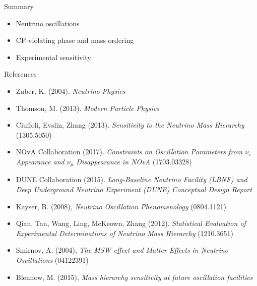 \documentclass{beamer}
\begin{document}
\begin{frame}{Summary}

	\begin{itemize}
		\item Neutrino oscillations
		\item CP-violating phase and mass ordering
		\item Experimental sensitivity
	\end{itemize}


\end{frame}

\begin{frame}{References}

	\scriptsize{
	\begin{itemize}
		\item Zuber, K. (2004). \emph{Neutrino Physics}
		\item Thomson, M. (2013). \emph{Modern Particle Physics}
		\item Ciuffoli, Evslin, Zhang (2013). \emph{Sensitivity to the Neutrino
			Mass Hierarchy}
			(1305.5050)
		\item NOvA Collaboration (2017). \emph{Constraints on Oscillation Parameters from
			$\nu_e$ Appearance and $\nu_\mu$ Disappearance in NOvA} (1703.03328)
		\item DUNE Collaboration (2015). \emph{Long-Baseline Neutrino Facility (LBNF) and
			Deep Underground Neutrino Experiment (DUNE) Conceptual Design Report}
		\item Kayser, B. (2008), \emph{Neutrino Oscillation Phenomenology} (0804.1121)
		\item Qian, Tan, Wang, Ling, McKeown, Zhang (2012). \emph{Statistical Evaluation of
			Experimental Determinations of Neutrino Mass Hierarchy} (1210.3651)
		\item Smirnov, A. (2004), \emph{The MSW effect and Matter Effects in Neutrino
			Oscillations} (04122391)
		\item Blennow, M. (2015), \emph{Mass hierarchy sensitivity at future
			oscillation facilities}
	\end{itemize}}

\end{frame}
\end{document}
